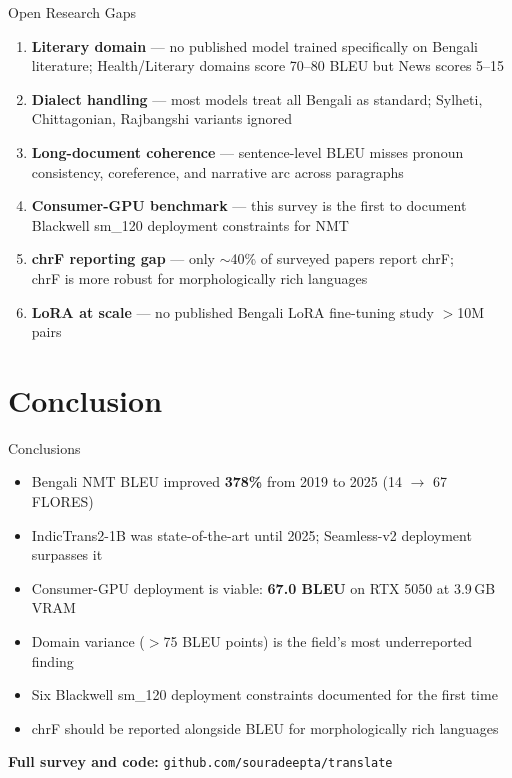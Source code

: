 \documentclass[aspectratio=169,10pt]{beamer}
\begin{document}
\begin{frame}{Open Research Gaps}
  \begin{enumerate}
    \item \textbf{Literary domain} --- no published model trained specifically on Bengali literature;
          Health/Literary domains score 70--80 BLEU but News scores 5--15
    \item \textbf{Dialect handling} --- most models treat all Bengali as standard;
          Sylheti, Chittagonian, Rajbangshi variants ignored
    \item \textbf{Long-document coherence} --- sentence-level BLEU misses pronoun consistency,
          coreference, and narrative arc across paragraphs
    \item \textbf{Consumer-GPU benchmark} --- this survey is the first to document\\
          Blackwell sm\_120 deployment constraints for NMT
    \item \textbf{chrF reporting gap} --- only $\sim$40\% of surveyed papers report chrF;\\
          chrF is more robust for morphologically rich languages
    \item \textbf{LoRA at scale} --- no published Bengali LoRA fine-tuning study $>$10M pairs
  \end{enumerate}
\end{frame}

\section{Conclusion}

\begin{frame}{Conclusions}
  \begin{itemize}
    \item Bengali NMT BLEU improved \textbf{378\%} from 2019 to 2025 (14 $\to$ 67 FLORES)
    \item IndicTrans2-1B was state-of-the-art until 2025; Seamless-v2 deployment surpasses it
    \item Consumer-GPU deployment is viable: \textbf{67.0 BLEU} on RTX 5050 at 3.9\,GB VRAM
    \item Domain variance ($>$75 BLEU points) is the field's most underreported finding
    \item Six Blackwell sm\_120 deployment constraints documented for the first time
    \item chrF should be reported alongside BLEU for morphologically rich languages
  \end{itemize}
  \vspace{0.3cm}
  \begin{center}
    \textbf{Full survey and code:} \texttt{github.com/souradeepta/translate}
  \end{center}
\end{frame}
\end{document}
